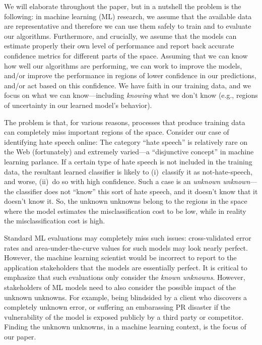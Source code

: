 We will elaborate throughout the paper, but in a nutshell the problem is the following: in machine learning (ML) research, we assume that the available data are representative and therefore we can use them safely to train and to evaluate our algorithms. Furthermore, and crucially, we assume that the models can estimate properly their own level of performance and report back accurate confidence metrics for different parts of the space. Assuming that we can know how well our algorithms are performing, we can work to improve the models, and/or improve the performance in regions of lower confidence in our predictions, and/or act based on this confidence.  We have faith in our training data, and we focus on what we can know---including \emph{knowing} what we don't know (e.g., regions of uncertainty in our learned model's behavior).

The problem is that, for various reasons, processes that produce training data can completely miss important regions of the space.  Consider our case of identifying hate speech online: The category ``hate speech'' is relatively rare on the Web (fortunately) and extremely varied---a ``disjunctive concept'' in machine learning parlance.  If a certain type of hate speech is not included in the training data, the resultant learned classifier is likely to (i)~classify it as not-hate-speech, and worse, (ii)~do so with high confidence.  Such a case is an \emph{unknown unknown}---the classifier does not ``know'' this sort of hate speech, and it doesn't know that it doesn't know it. So, the unknown unknowns belong to the regions in the space where the model estimates the misclassification cost to be low, while in reality the misclassification cost is high.

Standard ML evaluations may completely miss such issues: cross-validated error rates and area-under-the-curve values for such models may look nearly perfect.  However, the machine learning scientist would be incorrect to report to the application stakeholders that the models are essentially perfect.  It is critical to emphasize that such evaluations only consider the \emph{known unknowns}. However, stakeholders of ML models need to also consider the possible impact of the unknown unknowns. For example, being blindsided by a client who discovers a completely unknown error, or suffering an embarassing PR disaster if the vulnerability of the model is exposed publicly by a third party or competitor.   Finding the unknown unknowns, in a machine learning context, is the focus of our paper.

